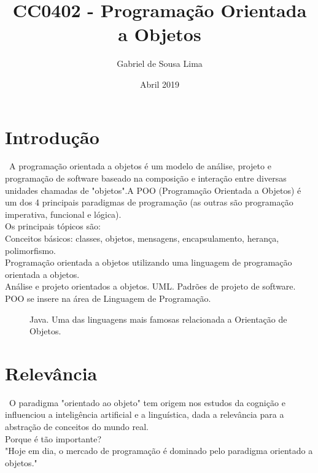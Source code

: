 \documentclass[a4paper, 10pt]{article}
\title{\bf CC0402 - Programação Orientada a Objetos}
\author{Gabriel de Sousa Lima}
\date{Abril 2019}
\begin{document}
\maketitle

\section{Introdução}
\ A programação orientada a objetos é um modelo de análise, projeto e programação 
de software baseado na composição e interação entre diversas unidades
chamadas de "objetos".A POO (Programação Orientada a Objetos) é um dos 4
principais paradigmas de programação (as outras são programação imperativa, funcional e lógica).\\
Os principais tópicos são: \\
Conceitos básicos: classes, objetos, mensagens, encapsulamento, herança, polimorfismo. \\
Programação orientada a objetos utilizando uma linguagem de programação orientada a objetos. ~\cite{wiki} \\
Análise e projeto orientados a objetos. UML. Padrões de projeto de software. \\
POO se insere na área de Linguagem de Programação. ~\cite{Kurt}
\begin{figure}[!htb]
    \caption{\label{fig:my-label} Java. Uma das linguagens mais famosas relacionada a Orientação de Objetos.}
\end{figure}

\section{Relevância}
\ O paradigma "orientado ao objeto" tem origem nos estudos da cognição e influenciou a inteligência artificial e a linguística, dada a relevância para a abstração de conceitos do mundo real.
\\ Porque é tão importante?
\\ "Hoje em dia, o mercado de programação é dominado pelo paradigma orientado a objetos." ~\cite{Jackson}
\\
\\
\\
\end{document}

